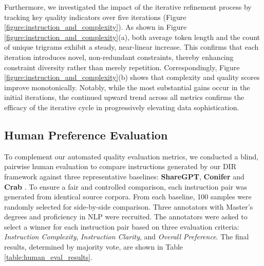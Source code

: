 Furthermore, we investigated the impact of the iterative refinement process by tracking key quality indicators over five iterations (Figure \ref{figure:instruction_and_complexity}). As shown in Figure \ref{figure:instruction_and_complexity}(a), both average token length and the count of unique trigrams exhibit a steady, near-linear increase. This confirms that each iteration introduces novel, non-redundant constraints, thereby enhancing constraint diversity rather than merely repetition. Correspondingly, Figure \ref{figure:instruction_and_complexity}(b) shows that complexity and quality scores improve monotonically. Notably, while the most substantial gains occur in the initial iterations, the continued upward trend across all metrics confirms the efficacy of the iterative cycle in progressively elevating data sophistication.

\subsection{Human Preference Evaluation}

To complement our automated quality evaluation metrics, we conducted a blind, pairwise human evaluation to compare instructions generated by our DIR framework against three representative baselines: \textbf{ShareGPT}, \textbf{Conifer} \citep{sun2024conifer} and \textbf{Crab} \citep{qi2024constraint}. To ensure a fair and controlled comparison, each instruction pair was generated from identical source corpora. From each baseline, 100 samples were randomly selected for side-by-side comparison. Three annotators with Master's degrees and proficiency in NLP were recruited. The annotators were asked to select a winner for each instruction pair based on three evaluation criteria: \textit{Instruction Complexity}, \textit{Instruction Clarity}, and \textit{Overall Preference}. The final results, determined by majority vote, are shown in Table \ref{table:human_eval_results}.

